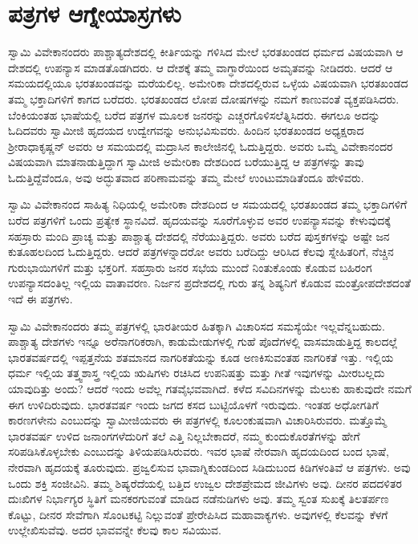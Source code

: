 
\chapter{ಪತ್ರಗಳ ಆಗ್ನೇಯಾಸ್ರಗಳು}

 ಸ್ವಾಮಿ ವಿವೇಕಾನಂದರು ಪಾಶ್ಚಾತ್ಯದೇಶದಲ್ಲಿ ಕೀರ್ತಿಯನ್ನು ಗಳಿಸಿದ ಮೇಲೆ ಭರತಖಂಡದ ಧರ್ಮದ ವಿಷಯವಾಗಿ ಆ ದೇಶದಲ್ಲಿ ಉಪನ್ಯಾಸ ಮಾಡತೊಡಗಿದರು. ಆ ದೇಶಕ್ಕೆ ತಮ್ಮ ವಾಗ್ಧಾರೆಯಿಂದ ಅಮೃತವನ್ನು ನೀಡಿದರು. ಆದರೆ ಆ ಸಮಯದಲ್ಲಿಯೂ ಭರತಖಂಡವನ್ನು ಮರೆಯಲಿಲ್ಲ. ಅಮೇರಿಕಾ ದೇಶದಲ್ಲಿರುವ ಒಳ್ಳೆಯ ವಿಷಯವಾಗಿ ಭರತಖಂಡದ ತಮ್ಮ ಭಕ್ತಾದಿಗಳಿಗೆ ಕಾಗದ ಬರೆದರು. ಭರತಖಂಡದ ಲೋಪ ದೋಷಗಳನ್ನು ನಮಗೆ ಕಾಣುವಂತೆ ವ್ಯಕ್ತಪಡಿಸಿದರು. ಬೆಂಕಿಯಂತಹ ಭಾಷೆಯಲ್ಲಿ ಬರೆದ ಪತ್ರಗಳ ಮೂಲಕ ಜನರನ್ನು ಎಚ್ಚರಗೊಳಿಸಲೆತ್ನಿಸಿದರು. ಈಗಲೂ ಅದನ್ನು ಓದಿದವರು ಸ್ವಾಮೀಜಿ ಹೃದಯದ ಉದ್ವೇಗವನ್ನು ಅನುಭವಿಸುವರು. ಹಿಂದಿನ ಭರತಖಂಡದ ಅಧ್ಯಕ್ಷರಾದ ಶ‍್ರೀ‌ರಾಧಾಕೃಷ್ಣನ್ ಅವರು ಆ ಸಮಯದಲ್ಲಿ ಮದ್ರಾಸಿನ ಕಾಲೇಜಿನಲ್ಲಿ ಓದುತ್ತಿದ್ದರು. ಅವರು ಒಮ್ಮೆ ವಿವೇಕಾನಂದರ ವಿಷಯವಾಗಿ ಮಾತನಾಡುತ್ತಿದ್ದಾಗ ಸ್ವಾಮೀಜಿ ಅಮೇರಿಕಾ ದೇಶದಿಂದ ಬರೆಯುತ್ತಿದ್ದ ಆ ಪತ್ರಗಳನ್ನು ತಾವು ಓದುತ್ತಿದ್ದೆವೆಂದೂ, ಅವು ಅದ್ಭುತವಾದ ಪರಿಣಾಮವನ್ನು ತಮ್ಮ ಮೇಲೆ ಉಂಟುಮಾಡಿತೆಂದೂ ಹೇಳಿವರು. 

 ಸ್ವಾಮಿ ವಿವೇಕಾನಂದ ಸಾಹಿತ್ಯ ನಿಧಿಯಲ್ಲಿ ಅಮೇರಿಕಾ ದೇಶದಿಂದ ಆ ಸಮಯದಲ್ಲಿ ಭರತಖಂಡದ ತಮ್ಮ ಭಕ್ತಾದಿಗಳಿಗೆ ಬರೆದ ಪತ್ರಗಳಿಗೆ ಒಂದು ಪ್ರತ್ಯೇಕ ಸ್ಥಾನವಿದೆ. ಹೃದಯವನ್ನು ಸೂರೆಗೊಳ್ಳುವ ಅವರ ಉಪನ್ಯಾಸವನ್ನು ಕೇಳುವುದಕ್ಕೆ ಸಹಸ್ರಾರು ಮಂದಿ ಪ್ರಾಚ್ಯ ಮತ್ತು ಪಾಶ್ಚಾತ್ಯ ದೇಶದಲ್ಲಿ ನೆರೆಯುತ್ತಿದ್ದರು. ಅವರು ಬರೆದ ಪುಸ್ತಕಗಳನ್ನು ಅಷ್ಟೇ ಜನ ಕುತೂಹಲದಿಂದ ಓದುತ್ತಿದ್ದರು. ಆದರೆ ಪತ್ರಗಳನ್ನಾದರೋ ‌ಅವರು ಬರೆದಿದ್ದು ಆರಿಸಿದ ಕೆಲವು ಸ್ನೇಹಿತರಿಗೆ, ನೆಚ್ಚಿನ ಗುರುಭಾಯಿಗಳಿಗೆ ಮತ್ತು ಭಕ್ತರಿಗೆ. ಸಹಸ್ರಾರು ಜನರ ಸಭೆಯ ಮುಂದೆ ನಿಂತುಕೊಂಡು ಕೊಡುವ ಬಹಿರಂಗ ಉಪನ್ಯಾಸದಂತಿಲ್ಲ ಇಲ್ಲಿಯ ವಾತಾವರಣ. ನಿರ್ಜನ ಪ್ರದೇಶದಲ್ಲಿ ಗುರು ತನ್ನ ಶಿಷ್ಯನಿಗೆ ಕೊಡುವ ಮಂತ್ರೋಪದೇಶದಂತೆ ಇದೆ ಈ ಪತ್ರಗಳು. 

 ಸ್ವಾಮಿ ವಿವೇಕಾನಂದರು ತಮ್ಮ ಪತ್ರಗಳಲ್ಲಿ ಭಾರತೀಯರ ಹಿತಕ್ಕಾಗಿ ವಿಚಾರಿಸದ ಸಮಸ್ಯೆಯೇ ಇಲ್ಲವೆನ್ನಬಹುದು. ಪಾಶ್ಚಾತ್ಯ ದೇಶಗಳು ಇನ್ನೂ ಅರೆನಾಗರಿಕರಾಗಿ, ಕಾಡುಮೇಡುಗಳಲ್ಲಿ ಗುಹೆ ಪೊದೆಗಳಲ್ಲಿ ವಾಸಮಾಡುತ್ತಿದ್ದ ಕಾಲದಲ್ಲೆ ಭಾರತವರ್ಷದಲ್ಲಿ ಇಪ್ಪತ್ತನೆಯ ಶತಮಾನದ ನಾಗರಿಕತೆಯನ್ನು ಕೂಡ ಅಣಕಿಸುವಂತಹ ನಾಗರಿಕತೆ ಇತ್ತು. ಇಲ್ಲಿಯ ಧರ್ಮ ಇಲ್ಲಿಯ ತತ್ತ್ವಶಾಸ್ತ್ರ ಇಲ್ಲಿಯ ಋಷಿಗಳು ರಚಿಸಿದ ಉಪನಿಷತ್ತು ಮತ್ತು ಗೀತೆ ಇವುಗಳನ್ನು ಮೀರಬಲ್ಲದು ಯಾವುದಿತ್ತು ಅಂದು? ಆದರೆ ಇಂದು ಅವೆಲ್ಲ ಗತವೈಭವವಾಗಿದೆ. ಕಳೆದ ಸವಿದಿನಗಳನ್ನು ಮೆಲುಕು ಹಾಕುವುದೇ ನಮಗೆ ಈಗ ಉಳಿದಿರುವುದು. ಭಾರತವರ್ಷ ಇಂದು ಜಗದ ಕಸದ ಬುಟ್ಟಿಯೊಳಗೆ ಇರುವುದು. ಇಂತಹ ಅಧೋಗತಿಗೆ ಕಾರಣಗಳೇನು ಎಂಬುದನ್ನು ಸ್ವಾಮೀಜಿಯವರು ಈ ಪತ್ರಗಳಲ್ಲಿ ಕೂಲಂಕುಷವಾಗಿ ವಿಚಾರಿಸಿರುವರು. ಮತ್ತೊಮ್ಮೆ ಭಾರತವರ್ಷ ಉಳಿದ ಜನಾಂಗಗಳೆದುರಿಗೆ ತಲೆ ಎತ್ತಿ ನಿಲ್ಲಬೇಕಾದರೆ, ನಮ್ಮ ಕುಂದುಕೊರತೆಗಳನ್ನು ಹೇಗೆ ಸರಿಪಡಿಸಿಕೊಳ್ಳಬೇಕು ಎಂಬುದನ್ನು ತಿಳಿಯಪಡಿಸಿರುವರು. ಇವರ ಭಾಷೆ ನೇರವಾಗಿ ಹೃದಯದಿಂದ ಬಂದ ಭಾಷೆ, ನೇರವಾಗಿ ಹೃದಯಕ್ಕೆ ತೂರುವುದು. ಪ್ರಜ್ವಲಿಸುವ ಭಾವಾಗ್ನಿಕುಂಡದಿಂದ ಸಿಡಿದುಬಂದ ಕಿಡಿಗಳಂತಿವೆ ಆ ಪತ್ರಗಳು. ಅವು ಒಂದು ಶಕ್ತಿ ಸಂಜೀವಿನಿ. ತಮ್ಮ ಶಿಷ್ಯರೆದೆಯಲ್ಲಿ ಬತ್ತಿದ ಉಜ್ವಲ ದೇಶಪ್ರೇಮದ ಜೀವಿಗಳು ಅವು. ದೀನರ ಪದದಳಿತರ ದುಃಖಿಗಳ ನಿರ್ಭಾಗ್ಯರ ಸ್ಥಿತಿಗೆ ಮನಕರಗುವಂತೆ ಮಾಡಿದ ನಡೆನುಡಿಗಳು ಅವು. ತಮ್ಮ ಸ್ವಂತ ಸುಖಕ್ಕೆ ತಿಲತರ್ಪಣ ಕೊಟ್ಟು, ದೀನರ ಸೇವೆಗಾಗಿ ಸೊಂಟಕಟ್ಟಿ ನಿಲ್ಲುವಂತೆ ಪ್ರೇರೇಪಿಸಿದ ಮಹಾವಾಕ್ಯಗಳು. ಅವುಗಳಲ್ಲಿ ಕೆಲವನ್ನು ಕೆಳಗೆ ಉಲ್ಲೇಖಿಸುವೆವು. ಅದರ ಭಾವವನ್ನೇ ಕೆಲವು ಕಾಲ ಸವಿಯುವ. 

